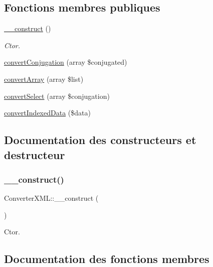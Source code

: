 \subsection*{Fonctions membres publiques}
\begin{DoxyCompactItemize}
\item 
\hyperlink{class_converter_x_m_l_a17333b84c46af11e00e7bbd4e7001bf4}{\+\_\+\+\_\+construct} ()
\begin{DoxyCompactList}\small\item\em Ctor. \end{DoxyCompactList}\item 
\hyperlink{class_converter_x_m_l_a4c2d281657ce13ceb048b56824fec42a}{convert\+Conjugation} (array \$conjugated)
\item 
\hyperlink{class_converter_x_m_l_adfb936c9e38f4cee04c0c16db4aa1f34}{convert\+Array} (array \$list)
\item 
\hyperlink{class_converter_x_m_l_a68b03941080baea355f4d9c71743343e}{convert\+Select} (array \$conjugation)
\item 
\hyperlink{class_converter_x_m_l_ab7c370229f1693cea20750b07cc0d1e7}{convert\+Indexed\+Data} (\$data)
\end{DoxyCompactItemize}


\subsection{Documentation des constructeurs et destructeur}
\hypertarget{class_converter_x_m_l_a17333b84c46af11e00e7bbd4e7001bf4}{}\label{class_converter_x_m_l_a17333b84c46af11e00e7bbd4e7001bf4} 
\subsubsection{\texorpdfstring{\+\_\+\+\_\+construct()}{\_\_construct()}}
{\footnotesize\ttfamily Converter\+X\+M\+L\+::\+\_\+\+\_\+construct (\begin{DoxyParamCaption}{ }\end{DoxyParamCaption})}



Ctor. 



\subsection{Documentation des fonctions membres}
\hypertarget{class_converter_x_m_l_adfb936c9e38f4cee04c0c16db4aa1f34}{}\label{class_converter_x_m_l_adfb936c9e38f4cee04c0c16db4aa1f34} 
